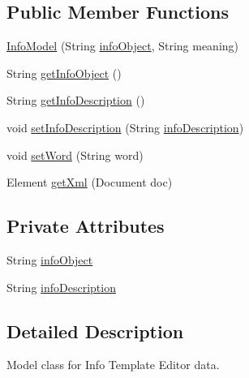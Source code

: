 \subsection*{Public Member Functions}
\begin{DoxyCompactItemize}
\item 
\hyperlink{classorg_1_1buildmlearn_1_1toolkit_1_1templates_1_1InfoModel_a5ffb5146ce8fcf0e4504cd8870e26544}{Info\+Model} (String \hyperlink{classorg_1_1buildmlearn_1_1toolkit_1_1templates_1_1InfoModel_a0a82e21182f12ef95d137636bd6cfa40}{info\+Object}, String meaning)
\item 
String \hyperlink{classorg_1_1buildmlearn_1_1toolkit_1_1templates_1_1InfoModel_a34b917e09a5b8a369d9a1b8fdb4e1043}{get\+Info\+Object} ()
\item 
String \hyperlink{classorg_1_1buildmlearn_1_1toolkit_1_1templates_1_1InfoModel_aaa53a79383392b5be51d202b76e65c5f}{get\+Info\+Description} ()
\item 
void \hyperlink{classorg_1_1buildmlearn_1_1toolkit_1_1templates_1_1InfoModel_a80956d6760064ebac06c98b0cd748825}{set\+Info\+Description} (String \hyperlink{classorg_1_1buildmlearn_1_1toolkit_1_1templates_1_1InfoModel_aacc1b5b917c422f08aa2e73c7b1228a5}{info\+Description})
\item 
void \hyperlink{classorg_1_1buildmlearn_1_1toolkit_1_1templates_1_1InfoModel_a207189ef74d5c4f2fc4a356d6135c14e}{set\+Word} (String word)
\item 
Element \hyperlink{classorg_1_1buildmlearn_1_1toolkit_1_1templates_1_1InfoModel_a603a8ab258eec5da500824267cbb86df}{get\+Xml} (Document doc)
\end{DoxyCompactItemize}
\subsection*{Private Attributes}
\begin{DoxyCompactItemize}
\item 
String \hyperlink{classorg_1_1buildmlearn_1_1toolkit_1_1templates_1_1InfoModel_a0a82e21182f12ef95d137636bd6cfa40}{info\+Object}
\item 
String \hyperlink{classorg_1_1buildmlearn_1_1toolkit_1_1templates_1_1InfoModel_aacc1b5b917c422f08aa2e73c7b1228a5}{info\+Description}
\end{DoxyCompactItemize}


\subsection{Detailed Description}
Model class for Info Template Editor data. 

